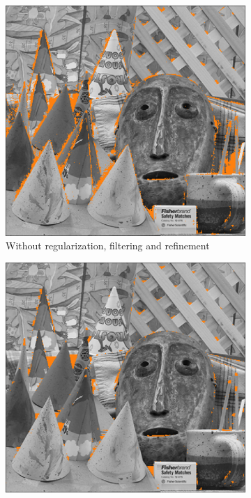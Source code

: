 \begin{figure}
    \centering
    \begin{subfigure}[t]{0.49\linewidth}
        \centering
        \includegraphics[width=\linewidth]{Images/Chap_5/comparison_wrong_intervals_no_reg.png}
        \caption{Without regularization, filtering and refinement}
        \label{fig:comparison_wrong_intervals_no_reg}
    \end{subfigure}
    \hfill\begin{subfigure}[t]{0.49\linewidth}
        \includegraphics[width=1\linewidth]{Images/Chap_5/comparison_wrong_intervals_reg.png}

\end{subfigure}
\end{figure}
